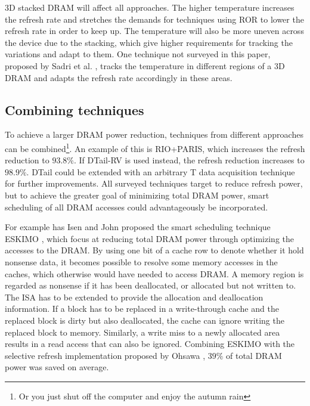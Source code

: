 3D stacked DRAM will affect all approaches. The higher temperature increases the refresh rate and stretches the demands for techniques using ROR to lower the refresh rate in order to keep up. The temperature will also be more uneven across the device due to the stacking, which give higher requirements for tracking the variations and adapt to them. One technique not surveyed in this paper, proposed by Sadri et al. \cite{tempaware}, tracks the temperature in different regions of a 3D DRAM and adapts the refresh rate accordingly in these areas.

\subsection{Combining techniques}

To achieve a larger DRAM power reduction, techniques from different approaches can be combined\footnote{Or you just shut off the computer and enjoy the autumn rain}. An example of this is RIO+PARIS, which increases the refresh reduction to $93.8\%$. If DTail-RV is used instead, the refresh reduction increases to $98.9\%$. DTail could be extended with an arbitrary T data acquisition technique for further improvements. All surveyed techniques target to reduce refresh power, but to achieve the greater goal of minimizing total DRAM power, smart scheduling of all DRAM accesses could advantageously be incorporated. 

For example has Isen and John proposed the smart scheduling technique ESKIMO \cite{eskimo}, which focus at reducing total DRAM power through optimizing the accesses to the DRAM. By using one bit of a cache row to denote whether it hold nonsense data, it becomes possible to resolve some memory accesses in the caches, which otherwise would have needed to access DRAM. A memory region is regarded as nonsense if it has been deallocated, or allocated but not written to. The ISA has to be extended to provide the allocation and deallocation information. If a block has to be replaced in a write-through cache and the replaced block is dirty but also deallocated, the cache can ignore writing the replaced block to memory. Similarly, a write miss to a newly allocated area results in a read access that can also be ignored. Combining ESKIMO with the selective refresh implementation proposed by Ohsawa \cite{ohsawa}, $39\%$ of total DRAM power was saved on average.


